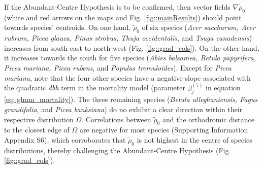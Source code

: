 If the Abundant-Centre Hypothesis is to be confirmed, then vector fields $ \nabla \tilde \rho_0 $ (white and red arrows on the maps and Fig. \ref{fig::mainResults}) should point towards species' centroids. On one hand, $ \tilde \rho_0 $ of six species (\textit{Acer saccharum, Acer rubrum, Picea glauca, Pinus strobus, Thuja occidentalis}, and \textit{Tsuga canadensis}) increases from south-east to north-west (Fig. \ref{fig::grad_cols}). On the other hand, it increases towards the south for five species (\textit{Abies balsamea, Betula papyrifera, Picea mariana, Picea rubens}, and \textit{Populus tremuloides}). Except for \textit{Picea mariana}, note that the four other species have a negative slope associated with the quadratic \textit{dbh} term in the mortality model (parameter $ \beta_j^{(7)} $ in equation \eqref{eq::glmm_mortality}). The three remaining species (\textit{Betula alleghaniensis, Fagus grandifolia}, and \textit{Picea banksiana}) do no exhibit a clear direction within their respective distribution $ \Omega $. Correlations between $ \tilde \rho_0 $ and the orthodromic distance to the closest edge of $ \Omega $ are negative for most species (Supporting Information Appendix S6), which corroborates that $ \tilde \rho_0 $ is not highest in the centre of species distributions, thereby challenging the Abundant-Centre Hypothesis (Fig. \ref{fig::grad_cols}).
